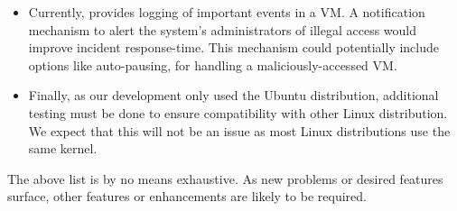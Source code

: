 \begin{itemize}
\item Currently,  provides logging of important events in a \ac{VM}. A notification mechanism to alert the system's administrators of illegal access would improve incident response-time. This mechanism could potentially include options like auto-pausing, for handling a maliciously-accessed \ac{VM}.

\item Finally, as our development only used the Ubuntu distribution, additional testing must be done to ensure compatibility with other Linux distribution. We expect that this will not be an issue as most Linux distributions use the same kernel.


\end{itemize}

\par The above list is by no means exhaustive. As new problems or desired features surface, other features or enhancements are likely to be required. 



